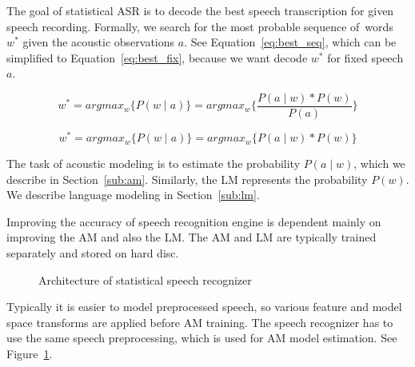 The goal of statistical \ac{ASR} is to decode 
the best speech transcription for given speech recording.
Formally, we search for the most probable sequence of~words $w^*$ given the acoustic observations $a$.
See Equation~\ref{eq:best_seq}, which can be simplified to Equation~\ref{eq:best_fix},
because we want decode $w^*$ for fixed speech $a$.

\begin{equation}\label{eq:best_seq}
    w^* = argmax_{w}\{P(w \mid a)\} = argmax_{w}\{\frac{P(a \mid w) * P(w)}{P(a)}\}
\end{equation}

\begin{equation}\label{eq:best_fix}
    w^* = argmax_{w}\{P(w \mid a)\} = argmax_{w}\{P(a \mid w) * P(w)\}
\end{equation}

The task of acoustic modeling is to estimate the probability $P(a \mid w)$,
which we describe in Section~\ref{sub:am}. 
Similarly, the \ac{LM} represents the probability $P(w)$.
We describe language modeling in Section~\ref{sub:lm}.

Improving the accuracy of speech recognition engine is dependent
mainly on improving the \ac{AM} and also the \ac{LM}.
The \ac{AM} and \ac{LM} are typically trained separately 
and stored on hard disc.

\begin{figure}[!htp]
    \begin{center}
    
    \caption{Architecture of statistical speech recognizer\cite{ney1990acoustic}}
    \label{fig:components} 
    \end{center}
\end{figure}

Typically it is easier to model preprocessed speech, 
so various feature and model space transforms are applied before \ac{AM} training.
The speech recognizer has to use the same speech preprocessing,
which is used for \ac{AM} model estimation.
See Figure~\ref{fig:components}.



